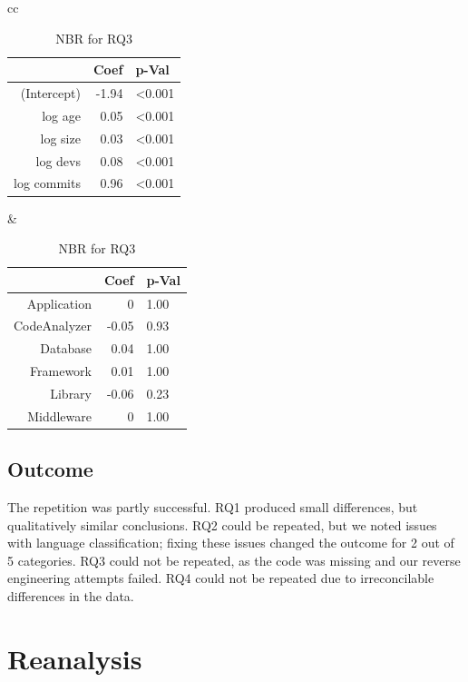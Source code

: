 \documentclass[acmsmall]{acmart}
\begin{document}
\begin{table}[!h]\centering \caption{NBR for RQ3}
\begin{tabular}{cc}
\begin{minipage}{4.5cm}\begin{tabular}{@{}r|rl@{}}  \hline
  \rule{0pt}{3ex} & Coef & p-Val \\ \hline \hline
(Intercept) & -1.94 & <0.001 \\ 
  log age & ~0.05 & <0.001 \\ 
  log size & ~0.03 & <0.001 \\ 
  log devs & ~0.08 & <0.001 \\ 
  log commits & ~0.96 &<0.001 \\  \hline \hline
\end{tabular}
\end{minipage}&\begin{minipage}{4.5cm}
\begin{tabular}{@{}r|rl@{}}  \hline
  \rule{0pt}{3ex} & Coef & p-Val \\ \hline \hline
Application & ~0 & 1.00 \\ 
  CodeAnalyzer & -0.05 & 0.93 \\ 
  Database & ~0.04 & 1.00 \\ 
  Framework & ~0.01 & 1.00 \\ 
  Library & -0.06 & 0.23 \\ 
  Middleware & ~0 & 1.00 \\    \hline
\end{tabular}\end{minipage}
\end{tabular}
\label{domainNBR}
\end{table}


\subsection{Outcome}

The repetition was partly successful. RQ1 produced small differences, but
qualitatively similar conclusions. RQ2 could be repeated, but we noted
issues with language classification; fixing these issues changed the outcome
for 2 out of 5 categories.  RQ3 could not be repeated, as the code was
missing and our reverse engineering attempts failed. RQ4 could not be
repeated due to irreconcilable differences in the data. 

\section{Reanalysis}
\end{document}
